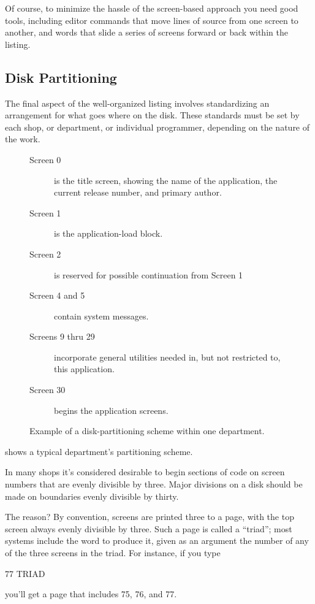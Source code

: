 Of course, to minimize the hassle of the screen-based approach you
need good tools, including editor commands that move lines of source
from one screen to another, and words that slide a series of screens
forward or back within the listing.

\subsection{Disk Partitioning}
The final aspect of the well-organized listing involves standardizing
an arrangement for what goes where on the disk.  These standards must
be set by each shop, or department, or individual programmer,
depending on the nature of the work.

\begin{figure*}
\caption{Example of a disk-partitioning scheme within one department.}

\begin{description}
\item[Screen 0] is the title screen, showing the name of the
    application, the current release number, and primary author.
\item[Screen 1] is the application-load block.
\item[Screen 2] is reserved for possible continuation from Screen 1
\item[Screen 4 and 5] contain system messages.
\item[Screens 9 thru 29] incorporate general utilities needed
    in, but not restricted to, this application.
\item[Screen 30] begins the application screens.
\end{description}
\end{figure*}

\noindent {} shows a typical department's partitioning scheme.

In many \Forth{} shops it's considered desirable to begin sections of
code on screen numbers that are evenly divisible by three.  Major
divisions on a disk should be made on boundaries evenly divisible by
thirty.

The reason? By convention, \Forth{} screens are printed three to a
page, with the top screen always evenly divisible by three.  Such a
page is called a ``triad''; most \Forth{} systems include the word
 to produce it, given as an argument the number of any of
the three screens in the triad.  For instance, if you type
\begin{Code}
77 TRIAD
\end{Code}
you'll get a page that includes 75, 76, and 77.

